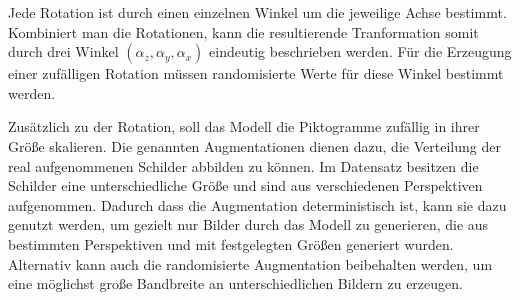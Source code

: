 Jede Rotation ist durch einen einzelnen Winkel um die jeweilige Achse bestimmt. Kombiniert man die Rotationen, kann die resultierende Tranformation somit durch drei Winkel $(\alpha_z, \alpha_y, \alpha_x)$ eindeutig beschrieben werden. Für die Erzeugung einer zufälligen Rotation müssen randomisierte Werte für diese Winkel bestimmt werden. \cite{math-primer}

Zusätzlich zu der Rotation, soll das Modell die Piktogramme zufällig in ihrer Größe skalieren. Die genannten Augmentationen dienen dazu, die Verteilung der real aufgenommenen Schilder abbilden zu können. Im Datensatz besitzen die Schilder eine unterschiedliche Größe und sind aus verschiedenen Perspektiven aufgenommen. Dadurch dass die Augmentation deterministisch ist, kann sie dazu genutzt werden, um gezielt nur Bilder durch das Modell zu generieren, die aus bestimmten Perspektiven und mit festgelegten Größen generiert wurden. Alternativ kann auch die randomisierte Augmentation beibehalten werden, um eine möglichst große Bandbreite an unterschiedlichen Bildern zu erzeugen.





